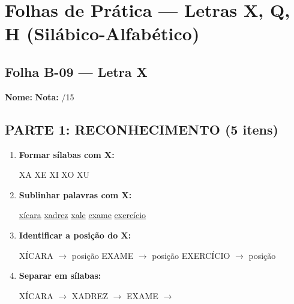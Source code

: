 \section{Folhas de Prática --- Letras X, Q, H (Silábico-Alfabético)}


\subsection{Folha B-09 --- Letra X}

\begin{exercicio}

\noindent\textbf{Nome:} \underline{\hspace{4cm}} \quad \textbf{Nota:} \underline{\hspace{1cm}}/15

\subsection*{PARTE 1: RECONHECIMENTO (5 itens)}

\begin{enumerate}
  \item \textbf{Formar sílabas com X:}
  \begin{center}
  XA \quad XE \quad XI \quad XO \quad XU
  \end{center}

  \item \textbf{Sublinhar palavras com X:}
  \begin{center}
  \uline{xícara} \quad \uline{xadrez} \quad \uline{xale} \quad \uline{exame} \quad \uline{exercício}
  \end{center}

  \item \textbf{Identificar a posição do X:}
  \begin{center}
  XÍCARA $\rightarrow$ posição \underline{\hspace{1cm}} \quad EXAME $\rightarrow$ posição \underline{\hspace{1cm}} \quad EXERCÍCIO $\rightarrow$ posição \underline{\hspace{1cm}}
  \end{center}

  \item \textbf{Separar em sílabas:}
  \begin{center}
  XÍCARA $\rightarrow$ \underline{\hspace{1cm}} \underline{\hspace{1cm}} \underline{\hspace{1cm}} \quad XADREZ $\rightarrow$ \underline{\hspace{1cm}} \underline{\hspace{1cm}} \quad EXAME $\rightarrow$ \underline{\hspace{1cm}} \underline{\hspace{1cm}} \underline{\hspace{1cm}}
  \end{center}


\end{enumerate}
\end{exercicio}
